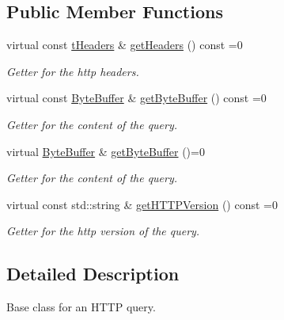 \subsection*{Public Member Functions}
\begin{DoxyCompactItemize}
\item 
virtual const \hyperlink{class_a_p_i_kachu_1_1_i_http_query_a15c3c9bc16ea76d23181bdc95e3ecca7}{t\+Headers} \& \hyperlink{class_a_p_i_kachu_1_1_i_http_query_ad7181b39532a572f26f3ed23e3b8aa4b}{get\+Headers} () const  =0
\begin{DoxyCompactList}\small\item\em Getter for the http headers. \end{DoxyCompactList}\item 
virtual const \hyperlink{struct_a_p_i_kachu_1_1_byte_buffer}{Byte\+Buffer} \& \hyperlink{class_a_p_i_kachu_1_1_i_http_query_a0125257a775e3652c170d2f5b35f62d7}{get\+Byte\+Buffer} () const  =0
\begin{DoxyCompactList}\small\item\em Getter for the content of the query. \end{DoxyCompactList}\item 
virtual \hyperlink{struct_a_p_i_kachu_1_1_byte_buffer}{Byte\+Buffer} \& \hyperlink{class_a_p_i_kachu_1_1_i_http_query_ab2e6857af2e0fcf8b80d19efff89c971}{get\+Byte\+Buffer} ()=0
\begin{DoxyCompactList}\small\item\em Getter for the content of the query. \end{DoxyCompactList}\item 
virtual const std\+::string \& \hyperlink{class_a_p_i_kachu_1_1_i_http_query_afcb8d29d65a39d58aeec117aebbeb210}{get\+H\+T\+T\+P\+Version} () const  =0\hypertarget{class_a_p_i_kachu_1_1_i_http_query_afcb8d29d65a39d58aeec117aebbeb210}{}\label{class_a_p_i_kachu_1_1_i_http_query_afcb8d29d65a39d58aeec117aebbeb210}

\begin{DoxyCompactList}\small\item\em Getter for the http version of the query. \end{DoxyCompactList}\end{DoxyCompactItemize}


\subsection{Detailed Description}
Base class for an H\+T\+TP query. 

